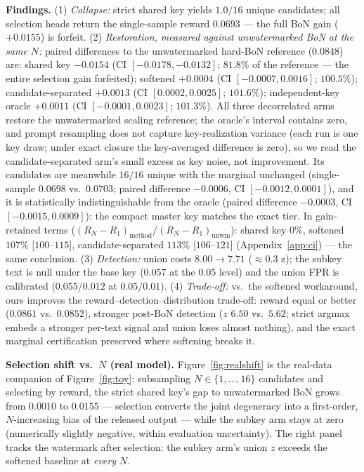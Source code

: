 \documentclass{article} %
\begin{document}
\textbf{Findings.}
(1) \emph{Collapse:} strict shared key yields $1.0/16$ unique candidates; all
selection heads return the single-sample reward $0.0693$ --- the full BoN gain
($+0.0155$) is forfeit.
(2) \emph{Restoration, measured against unwatermarked BoN at the same $N$:}
paired differences to the unwatermarked hard-BoN reference ($0.0848$) are:
shared key $-0.0154$ (CI $[-0.0178,-0.0132]$; $81.8\%$ of the reference ---
the entire selection gain forfeited); softened $+0.0004$ (CI
$[-0.0007,0.0016]$; $100.5\%$); candidate-separated $+0.0013$ (CI
$[0.0002,0.0025]$; $101.6\%$); independent-key oracle $+0.0011$ (CI
$[-0.0001,0.0023]$; $101.3\%$). All three decorrelated arms restore the
unwatermarked scaling reference; the oracle's interval contains zero, and
prompt resampling does not capture key-realization variance (each run is one
key draw; under exact closure the key-averaged difference is zero), so we
read the candidate-separated arm's small excess as key noise, not
improvement. Its candidates are meanwhile $16/16$ unique with the marginal
unchanged (single-sample $0.0698$ vs.\ $0.0703$; paired difference
$-0.0006$, CI $[-0.0012,0.0001]$), and it is statistically indistinguishable
from the oracle (paired difference $-0.0003$, CI $[-0.0015,0.0009]$): the
compact master key matches the exact tier. In gain-retained terms
($(R_N{-}R_1)_{\mathrm{method}}/(R_N{-}R_1)_{\mathrm{unwm}}$): shared key
$0\%$, softened $107\%$ [$100$--$115$], candidate-separated $113\%$
[$106$--$121$] (Appendix~\ref{app:ci}) --- the same conclusion.
(3) \emph{Detection:} union costs $8.00\to7.71$ ($\approx0.3$ z); the subkey text is
null under the base key ($0.057$ at the $0.05$ level) and the union FPR is
calibrated ($0.055$/$0.012$ at $0.05$/$0.01$).
(4) \emph{Trade-off:} vs.\ the softened workaround, ours improves the
reward--detection--distribution trade-off: reward equal or better ($0.0861$
vs.\ $0.0852$), stronger post-BoN detection ($z$ $6.50$ vs.\ $5.62$; strict
argmax embeds a stronger per-text signal and union loses almost nothing), and
the exact marginal certification preserved where softening breaks it.

\textbf{Selection shift vs.\ $N$ (real model).}
Figure~\ref{fig:realshift} is the real-data companion of Figure~\ref{fig:toy}:
subsampling $N\in\{1,\dots,16\}$ candidates and selecting by reward, the strict
shared key's gap to unwatermarked BoN grows from $0.0010$ to $0.0155$ ---
selection converts the joint degeneracy into a first-order, $N$-increasing
bias of the released output --- while the subkey arm stays at zero
(numerically slightly negative, within evaluation uncertainty). The right panel tracks the watermark after selection: the
subkey arm's union $z$ exceeds the softened baseline at \emph{every} $N$.
\end{document}
